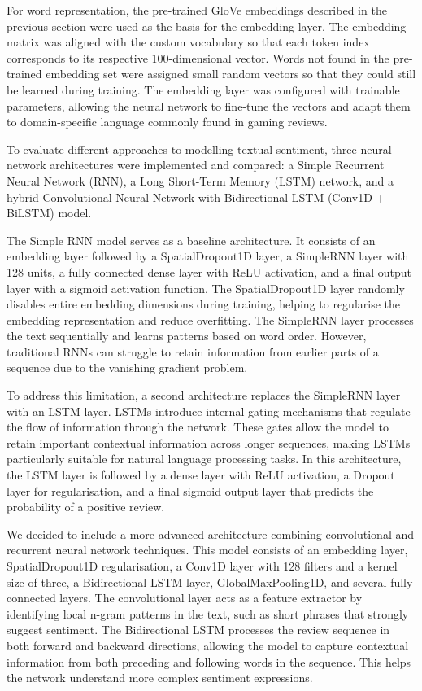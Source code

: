 \documentclass[12pt,a4paper]{article}
\begin{document}
For word representation, the pre-trained GloVe embeddings described in the previous section were used as the basis for the embedding layer. The embedding matrix was aligned with the custom vocabulary so that each token index corresponds to its respective 100-dimensional vector. Words not found in the pre-trained embedding set were assigned small random vectors so that they could still be learned during training. The embedding layer was configured with trainable parameters, allowing the neural network to fine-tune the vectors and adapt them to domain-specific language commonly found in gaming reviews.

To evaluate different approaches to modelling textual sentiment, three neural network architectures were implemented and compared: a Simple Recurrent Neural Network (RNN), a Long Short-Term Memory (LSTM) network, and a hybrid Convolutional Neural Network with Bidirectional LSTM (Conv1D + BiLSTM) model.

The Simple RNN model serves as a baseline architecture. It consists of an embedding layer followed by a SpatialDropout1D layer, a SimpleRNN layer with 128 units, a fully connected dense layer with ReLU activation, and a final output layer with a sigmoid activation function. The SpatialDropout1D layer randomly disables entire embedding dimensions during training, helping to regularise the embedding representation and reduce overfitting. The SimpleRNN layer processes the text sequentially and learns patterns based on word order. However, traditional RNNs can struggle to retain information from earlier parts of a sequence due to the vanishing gradient problem.

To address this limitation, a second architecture replaces the SimpleRNN layer with an LSTM layer. LSTMs introduce internal gating mechanisms that regulate the flow of information through the network. These gates allow the model to retain important contextual information across longer sequences, making LSTMs particularly suitable for natural language processing tasks. In this architecture, the LSTM layer is followed by a dense layer with ReLU activation, a Dropout layer for regularisation, and a final sigmoid output layer that predicts the probability of a positive review.

We decided to include a more advanced architecture combining convolutional and recurrent neural network techniques. This model consists of an embedding layer, SpatialDropout1D regularisation, a Conv1D layer with 128 filters and a kernel size of three, a Bidirectional LSTM layer, GlobalMaxPooling1D, and several fully connected layers. The convolutional layer acts as a feature extractor by identifying local n-gram patterns in the text, such as short phrases that strongly suggest sentiment. The Bidirectional LSTM processes the review sequence in both forward and backward directions, allowing the model to capture contextual information from both preceding and following words in the sequence. This helps the network understand more complex sentiment expressions.
\end{document}
